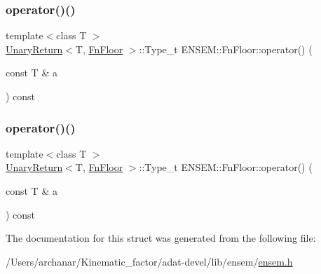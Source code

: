 \mbox{\label{structENSEM_1_1FnFloor_a4452d47aaa4edbfb7644f14a1b3e55f0}} 
\subsubsection{\texorpdfstring{operator()()}{operator()()}\hspace{0.1cm}{\footnotesize\ttfamily [2/3]}}
{\footnotesize\ttfamily template$<$class T $>$ \\
\mbox{\hyperlink{structENSEM_1_1UnaryReturn}{Unary\+Return}}$<$T, \mbox{\hyperlink{structENSEM_1_1FnFloor}{Fn\+Floor}} $>$\+::Type\+\_\+t E\+N\+S\+E\+M\+::\+Fn\+Floor\+::operator() (\begin{DoxyParamCaption}\item[{const T \&}]{a }\end{DoxyParamCaption}) const\hspace{0.3cm}{\ttfamily [inline]}}

\mbox{\label{structENSEM_1_1FnFloor_a4452d47aaa4edbfb7644f14a1b3e55f0}} 
\subsubsection{\texorpdfstring{operator()()}{operator()()}\hspace{0.1cm}{\footnotesize\ttfamily [3/3]}}
{\footnotesize\ttfamily template$<$class T $>$ \\
\mbox{\hyperlink{structENSEM_1_1UnaryReturn}{Unary\+Return}}$<$T, \mbox{\hyperlink{structENSEM_1_1FnFloor}{Fn\+Floor}} $>$\+::Type\+\_\+t E\+N\+S\+E\+M\+::\+Fn\+Floor\+::operator() (\begin{DoxyParamCaption}\item[{const T \&}]{a }\end{DoxyParamCaption}) const\hspace{0.3cm}{\ttfamily [inline]}}



The documentation for this struct was generated from the following file\+:\begin{DoxyCompactItemize}
\item 
/\+Users/archanar/\+Kinematic\+\_\+factor/adat-\/devel/lib/ensem/\mbox{\hyperlink{adat-devel_2lib_2ensem_2ensem_8h}{ensem.\+h}}\end{DoxyCompactItemize}
